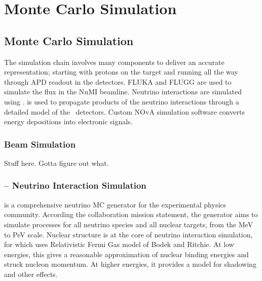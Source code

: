 \chapter{Monte Carlo Simulation}
\label{sim_chapter}


\section{Monte Carlo Simulation}
\label{sim}

The \nova simulation chain involves many components to deliver an accurate representation; starting with protons on the \numi target and running all the way through APD readout in the \nova detectors.  FLUKA and FLUGG are used to simulate the flux in the NuMI beamline.  \cite{fluka}  Neutrino interactions are simulated using \genie.\cite{genie}  \geant is used to propagate products of the neutrino interactions through a detailed model of the \nova~detectors.\cite{geant}  Custom NOvA simulation software converts energy depositions into electronic signals.

\subsection{Beam Simulation}


Stuff here.  Gotta figure out what.

\subsection{\genie -- Neutrino Interaction Simulation}


\genie is a comprehensive neutrino MC generator for the experimental physics community.  According the \genie collaboration mission statement, the generator aims to simulate processes  for all neutrino species and all nuclear targets, from the MeV to PeV scale.  Nuclear structure is at the core of neutrino interaction simulation, for which \genie uses  Relativistic Fermi Gas model of Bodek and Ritchie.  \cite{bodekritchie}  At low energies, this gives a reasonable approximation of nuclear binding energies and struck nucleon momentum.  At higher energies, it provides a model for shadowing and other effects.

